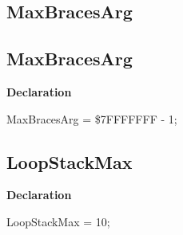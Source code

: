\documentclass{report}
\newif\ifpdf
\begin{document}
\subsection*{\large{\textbf{MaxBracesArg}}\normalsize\hspace{1ex}\hrulefill}
\else
\subsection*{MaxBracesArg}
\fi
\label{RegExpr-MaxBracesArg}
\begin{list}{}{
\setlength{\itemindent}{0cm}
\setlength{\listparindent}{0cm}
\setlength{\leftmargin}{\evensidemargin}
\addtolength{\leftmargin}{\tmplength}
\settowidth{\labelsep}{X}
\addtolength{\leftmargin}{\labelsep}
\setlength{\labelwidth}{\tmplength}
}
\item[\textbf{Declaration}\hfill]
\ifpdf
\begin{flushleft}
\fi
\begin{ttfamily}
MaxBracesArg = {\$}7FFFFFFF - 1;\end{ttfamily}

\ifpdf
\end{flushleft}
\fi

\end{list}
\ifpdf
\subsection*{\large{\textbf{LoopStackMax}}\normalsize\hspace{1ex}\hrulefill}
\else
\subsection*{LoopStackMax}
\fi
\label{RegExpr-LoopStackMax}
\begin{list}{}{
\setlength{\itemindent}{0cm}
\setlength{\listparindent}{0cm}
\setlength{\leftmargin}{\evensidemargin}
\addtolength{\leftmargin}{\tmplength}
\settowidth{\labelsep}{X}
\addtolength{\leftmargin}{\labelsep}
\setlength{\labelwidth}{\tmplength}
}
\item[\textbf{Declaration}\hfill]
\ifpdf
\begin{flushleft}
\fi
\begin{ttfamily}
LoopStackMax = 10;\end{ttfamily}

\ifpdf
\end{flushleft}
\fi

\end{list}
\ifpdf
\end{document}
